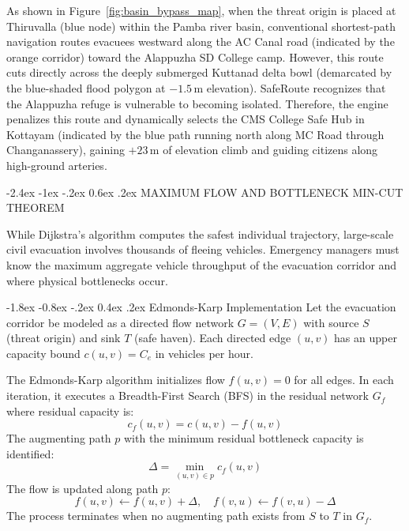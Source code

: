 \documentclass[12pt,oneside]{report}
\makeatletter
\renewcommand{\section}{\@startsection{section}{1}{\z@}%
  {-2.4ex \@plus -1ex \@minus -.2ex}%
  {0.6ex \@plus .2ex}%
  {\normalfont\large\bfseries}}
\renewcommand{\subsection}{\@startsection{subsection}{2}{\z@}%
  {-1.8ex \@plus -0.8ex \@minus -.2ex}%
  {0.4ex \@plus .2ex}%
  {\normalfont\normalsize\bfseries}}
\makeatother
\begin{document}
As shown in Figure~\ref{fig:basin_bypass_map}, when the threat origin is placed at Thiruvalla (blue node) within the Pamba river basin, conventional shortest-path navigation routes evacuees westward along the AC Canal road (indicated by the orange corridor) toward the Alappuzha SD College camp. However, this route cuts directly across the deeply submerged Kuttanad delta bowl (demarcated by the blue-shaded flood polygon at $-1.5$\,m elevation). SafeRoute recognizes that the Alappuzha refuge is vulnerable to becoming isolated. Therefore, the engine penalizes this route and dynamically selects the CMS College Safe Hub in Kottayam (indicated by the blue path running north along MC Road through Changanassery), gaining $+23$\,m of elevation climb and guiding citizens along high-ground arteries.

\section{MAXIMUM FLOW AND BOTTLENECK MIN-CUT THEOREM}

While Dijkstra's algorithm computes the safest individual trajectory, large-scale civil evacuation involves thousands of fleeing vehicles. Emergency managers must know the maximum aggregate vehicle throughput of the evacuation corridor and where physical bottlenecks occur.

\subsection{Edmonds-Karp Implementation}
Let the evacuation corridor be modeled as a directed flow network $G = (V, E)$ with source $S$ (threat origin) and sink $T$ (safe haven). Each directed edge $(u, v)$ has an upper capacity bound $c(u, v) = C_e$ in vehicles per hour.

The Edmonds-Karp algorithm initializes flow $f(u, v) = 0$ for all edges. In each iteration, it executes a Breadth-First Search (BFS) in the residual network $G_f$ where residual capacity is:
\begin{equation}
    c_f(u, v) = c(u, v) - f(u, v)
\end{equation}
The augmenting path $p$ with the minimum residual bottleneck capacity is identified:
\begin{equation}
    \Delta = \min_{(u, v) \in p} c_f(u, v)
\end{equation}
The flow is updated along path $p$:
\begin{equation}
    f(u, v) \leftarrow f(u, v) + \Delta, \quad f(v, u) \leftarrow f(v, u) - \Delta
\end{equation}
The process terminates when no augmenting path exists from $S$ to $T$ in $G_f$.
\end{document}
